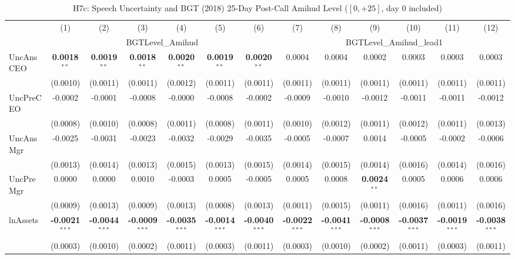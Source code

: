 \begin{landscape}
\begin{table}[H]
\setlength{\tabcolsep}{3pt}
\renewcommand{\arraystretch}{0.85}
\centering
\caption{H7c: Speech Uncertainty and BGT (2018) 25-Day Post-Call Amihud Level ($[0,+25]$, day 0 included)}
\label{tab:h7c}
\scriptsize
\begin{tabular}{lcccccccccccc}
\toprule
 & (1) & (2) & (3) & (4) & (5) & (6) & (7) & (8) & (9) & (10) & (11) & (12) \\
 & \multicolumn{6}{c}{BGTLevel\_Amihud} & \multicolumn{6}{c}{BGTLevel\_Amihud\_lead1} \\
\cmidrule(lr){2-7} \cmidrule(lr){8-13}
\midrule
UncAnsCEO & \textbf{0.0018}$^{**}$ & \textbf{0.0019}$^{**}$ & \textbf{0.0018}$^{**}$ & \textbf{0.0020}$^{**}$ & \textbf{0.0019}$^{**}$ & \textbf{0.0020}$^{**}$ & 0.0004 & 0.0004 & 0.0002 & 0.0003 & 0.0003 & 0.0003 \\
 & (0.0010) & (0.0011) & (0.0011) & (0.0012) & (0.0011) & (0.0011) & (0.0011) & (0.0011) & (0.0011) & (0.0011) & (0.0011) & (0.0011) \\
UncPreCEO & -0.0002 & -0.0001 & -0.0008 & -0.0000 & -0.0008 & -0.0002 & -0.0009 & -0.0010 & -0.0012 & -0.0011 & -0.0011 & -0.0012 \\
 & (0.0008) & (0.0010) & (0.0008) & (0.0011) & (0.0008) & (0.0011) & (0.0010) & (0.0012) & (0.0011) & (0.0012) & (0.0011) & (0.0013) \\
UncAnsMgr & -0.0025 & -0.0031 & -0.0023 & -0.0032 & -0.0029 & -0.0035 & -0.0005 & -0.0007 & 0.0014 & -0.0005 & -0.0002 & -0.0006 \\
 & (0.0013) & (0.0014) & (0.0013) & (0.0015) & (0.0013) & (0.0015) & (0.0014) & (0.0015) & (0.0014) & (0.0016) & (0.0014) & (0.0016) \\
UncPreMgr & 0.0000 & 0.0000 & 0.0010 & -0.0003 & 0.0005 & -0.0005 & 0.0005 & 0.0008 & \textbf{0.0024}$^{**}$ & 0.0005 & 0.0006 & 0.0006 \\
 & (0.0009) & (0.0013) & (0.0009) & (0.0013) & (0.0008) & (0.0013) & (0.0011) & (0.0015) & (0.0011) & (0.0016) & (0.0011) & (0.0016) \\
\midrule
lnAssets & \textbf{-0.0021}$^{***}$ & \textbf{-0.0044}$^{***}$ & \textbf{-0.0009}$^{***}$ & \textbf{-0.0035}$^{***}$ & \textbf{-0.0014}$^{***}$ & \textbf{-0.0040}$^{***}$ & \textbf{-0.0022}$^{***}$ & \textbf{-0.0041}$^{***}$ & \textbf{-0.0008}$^{***}$ & \textbf{-0.0037}$^{***}$ & \textbf{-0.0019}$^{***}$ & \textbf{-0.0038}$^{***}$ \\
 & (0.0003) & (0.0010) & (0.0002) & (0.0011) & (0.0003) & (0.0011) & (0.0003) & (0.0010) & (0.0002) & (0.0011) & (0.0003) & (0.0011) \\

\end{tabular}
\end{table}
\end{landscape}
